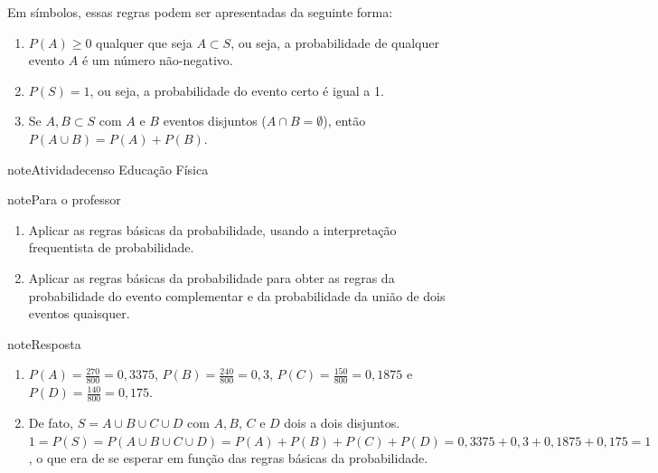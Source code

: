 Em símbolos, essas regras podem ser apresentadas da seguinte forma:
\begin{enumerate}
\item {} 
\(P(A)\geq 0\) qualquer que seja \(A\subset S\), ou seja, a probabilidade de qualquer evento \(A\) é um número não-negativo.

\item {} 
\(P(S)=1\), ou seja, a probabilidade do evento certo é igual a 1.

\item {} 
Se \(A,B\subset S\) com \(A\) e \(B\) eventos disjuntos (\(A\cap B=\emptyset\)), então \(P(A\cup B)=P(A)+P(B)\).

\end{enumerate}
\begin{sphinxadmonition}{note}{Atividade}{censo Educação Física}
\label{ativ-probabilidade-atividade-fisica}

\begin{sphinxadmonition}{note}{Para o professor}

\begin{enumerate}
\item {} 
Aplicar as regras básicas da probabilidade, usando a interpretação frequentista de probabilidade.

\item {} 
Aplicar as regras básicas da probabilidade para obter as regras da probabilidade do evento complementar e da probabilidade da união de dois eventos quaisquer.

\end{enumerate}

\begin{sphinxadmonition}{note}{Resposta}

\begin{enumerate}
\item {} 
\(P(A)=\frac{270}{800}=0,3375\), \(P(B)=\frac{240}{800}=0,3\), \(P(C)=\frac{150}{800}=0,1875\) e \(P(D)=\frac{140}{800}=0,175\).

\item {} 
De fato, \(S=A\cup B\cup C\cup D\) com \(A, B\), \(C\) e \(D\) dois a dois disjuntos. \(1=P(S)=P(A\cup B\cup C\cup D)=P(A)+P(B)+P(C)+P(D)=0,3375+0,3+0,1875+0,175=1\), o que era de se esperar em função das regras básicas da probabilidade.


\end{enumerate}
\end{sphinxadmonition}
\end{sphinxadmonition}
\end{sphinxadmonition}
